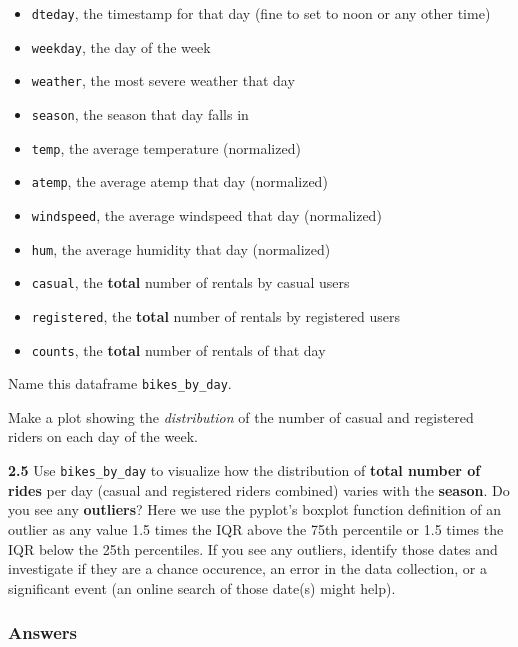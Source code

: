 \documentclass[11pt]{article}
\providecommand{\tightlist}{%
      \setlength{\itemsep}{0pt}\setlength{\parskip}{0pt}}
\begin{document}
\begin{itemize}
\tightlist
\item
  \texttt{dteday}, the timestamp for that day (fine to set to noon or
  any other time)
\item
  \texttt{weekday}, the day of the week
\item
  \texttt{weather}, the most severe weather that day
\item
  \texttt{season}, the season that day falls in
\item
  \texttt{temp}, the average temperature (normalized)
\item
  \texttt{atemp}, the average atemp that day (normalized)
\item
  \texttt{windspeed}, the average windspeed that day (normalized)
\item
  \texttt{hum}, the average humidity that day (normalized)
\item
  \texttt{casual}, the \textbf{total} number of rentals by casual users
\item
  \texttt{registered}, the \textbf{total} number of rentals by
  registered users
\item
  \texttt{counts}, the \textbf{total} number of rentals of that day
\end{itemize}

Name this dataframe \texttt{bikes\_by\_day}.

Make a plot showing the \emph{distribution} of the number of casual and
registered riders on each day of the week.

\textbf{2.5} Use \texttt{bikes\_by\_day} to visualize how the
distribution of \textbf{total number of rides} per day (casual and
registered riders combined) varies with the \textbf{season}. Do you see
any \textbf{outliers}? Here we use the pyplot's boxplot function
definition of an outlier as any value 1.5 times the IQR above the 75th
percentile or 1.5 times the IQR below the 25th percentiles. If you see
any outliers, identify those dates and investigate if they are a chance
occurence, an error in the data collection, or a significant event (an
online search of those date(s) might help).

    \subsubsection{Answers}\label{answers}
\end{document}
